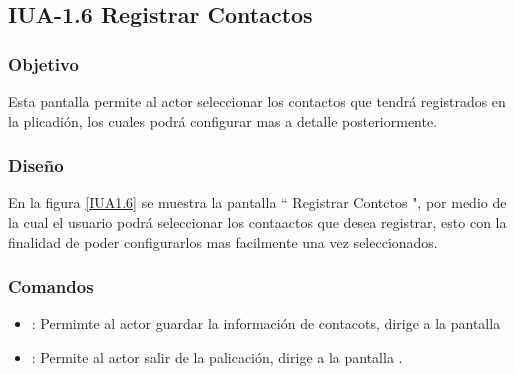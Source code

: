 \subsection{IUA-1.6 Registrar Contactos}

\subsubsection{Objetivo}

	
 Esta pantalla permite al actor seleccionar los contactos que tendrá registrados en la plicadión, los cuales podrá configurar mas a detalle posteriormente.
\subsubsection{Diseño}


    En la figura \ref{IUA1.6} se muestra la pantalla `` Registrar Contctos ", por medio de la cual el usuario podrá seleccionar los contaactos que desea registrar, esto con la finalidad de poder configurarlos mas facilmente una vez seleccionados.


   

\subsubsection{Comandos}
    \begin{itemize}
    	\item {}: Permimte al actor guardar la información de contacots, dirige a la pantalla 
      \item \btnRegresar[Regresar]: Permite al actor salir de la palicación, dirige a la pantalla .
    \end{itemize}
